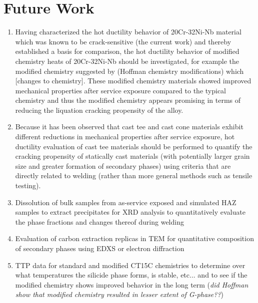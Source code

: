 \chapter{Future Work} \label{ch:future-work}
\begin{enumerate}
\item Having characterized the hot ductility behavior of 20Cr-32Ni-Nb material which was known to be crack-sensitive (the current work) and thereby established a basis for comparison, the hot ductility behavior of modified chemistry heats of 20Cr-32Ni-Nb should be investigated, for example the modified chemistry suggested by (Hoffman chemistry modifications) which [changes to chemistry]. These modified chemistry materials showed improved mechanical properties after service exposure compared to the typical chemistry and thus the modified chemistry appears promising in terms of reducing the liquation cracking propensity of the alloy.
\item Because it has been observed that cast tee and cast cone materials exhibit different reductions in mechanical properties after service exposure, hot ductility evaluation of cast tee materials should be performed to quantify the cracking propensity of statically cast materials (with potentially larger grain size and greater formation of secondary phases) using criteria that are directly related to welding (rather than more general methods such as tensile testing).
\item Dissolution of bulk samples from as-service exposed and simulated HAZ samples to extract precipitates for XRD analysis to quantitatively evaluate the phase fractions and changes thereof during welding
\item Evaluation of carbon extraction replicas in TEM for quantitative composition of secondary phases using EDXS or electron diffraction
\item TTP data for standard and modified CT15C chemistries to determine over what temperatures the silicide phase forms, is stable, etc... and to see if the modified chemistry shows improved behavior in the long term (\emph{did Hoffman show that modified chemistry resulted in lesser extent of G-phase??})
\end{enumerate}
